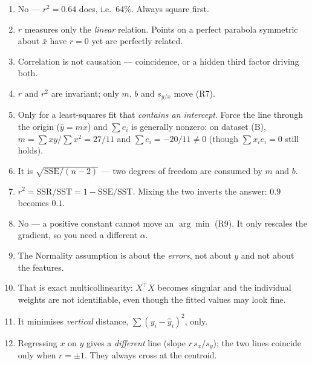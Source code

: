 \begin{trapbox}
\begin{enumerate}
\item {}
      No --- $r^2=0.64$ does, i.e.\ 64\%. Always square first.
\item {}
      $r$ measures only the \emph{linear} relation. Points on a perfect parabola
      symmetric about $\bar x$ have $r=0$ yet are perfectly related.
\item {}
      Correlation is not causation --- coincidence, or a hidden third factor driving both.
\item {}
      $r$ and $r^2$ are invariant; only $m$, $b$ and $s_{y/x}$ move (R7).
\item {}
      Only for a least-squares fit that \emph{contains an intercept}. Force the line
      through the origin ($\hat y=mx$) and $\sum e_i$ is generally nonzero: on dataset
      (B), $m=\sum xy/\sum x^2=27/11$ and $\sum e_i=-20/11\ne0$ (though
      $\sum x_ie_i=0$ still holds).
\item {}
      It is $\sqrt{\mathrm{SSE}/(n-2)}$ --- two degrees of freedom are consumed by
      $m$ and $b$.
\item {}
      $r^2=\mathrm{SSR}/\mathrm{SST}=1-\mathrm{SSE}/\mathrm{SST}$. Mixing the two
      inverts the answer: $0.9$ becomes $0.1$.
\item {}
      No --- a positive constant cannot move an $\arg\min$ (R9). It only rescales the
      gradient, so you need a different $\alpha$.
\item {}
      The Normality assumption is about the \emph{errors}, not about $y$ and not about
      the features.
\item {}
      That is exact multicollinearity: $X^{\!\top}\!X$ becomes singular and the individual
      weights are not identifiable, even though the fitted values may look fine.
\item {}
      It minimises \emph{vertical} distance, $\sum(y_i-\hat y_i)^2$, only.
\item {}
      Regressing $x$ on $y$ gives a \emph{different} line (slope $r\,s_x/s_y$); the two
      lines coincide only when $r=\pm1$. They always cross at the centroid.
\end{enumerate}
\end{trapbox}

